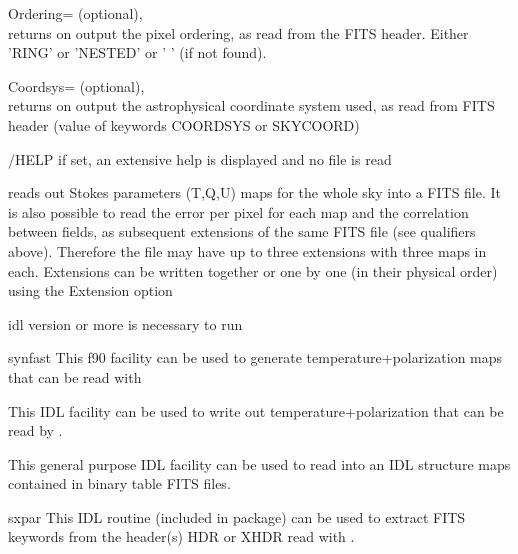 \begin{qualifiers}
\begin{qulist}{}
	 \item[{Ordering=}] 
	        (optional), \\
	        returns on output the pixel ordering, as read from the FITS
	        header. Either 'RING' or 'NESTED' or ' ' (if not found).

	 \item[{Coordsys=}] 
	        (optional), \\
	        returns on output the astrophysical coordinate system used, 
		as read from FITS header (value of keywords COORDSYS or SKYCOORD)

  \end{qulist}
\end{qualifiers}

\begin{keywords}
  \begin{kwlist}{} %
	\item[{/HELP}]   if set, an extensive help is displayed and no
	file is read
   \end{kwlist}
\end{keywords}

\begin{codedescription}
{\thedocid { }reads out Stokes parameters (T,Q,U) maps for the whole
sky into a FITS file. It is also possible to read the error per pixel for each
map and the correlation between fields, as subsequent extensions of the same FITS
file (see qualifiers above). Therefore the file may have up to three extensions with three
maps in each. Extensions can be written together or one by one (in
their physical order) using the Extension option}
\end{codedescription}



\begin{related}
  \begin{sulist}{} %
  \item[idl] version \idlversion or more is necessary to run \thedocid
  \item[synfast] This \healpix f90 facility can be used to generate
  temperature+polarization maps that can be read with \thedocid
  \item[\htmlref{write\_tqu}{idl:write_tqu}] This \healpix IDL facility can be used to write
  out temperature+polarization that can be read by \thedocid.

  \item[\htmlref{read\_fits\_s}{idl:read_fits_s}] This general purpose \healpix IDL facility can be used to read
  into an IDL structure maps contained in binary table FITS files.
  \item[sxpar] This IDL routine (included in \healpix package) can be
  used to extract FITS keywords from the header(s) HDR or XHDR read with \thedocid.
  \end{sulist}
\end{related}


